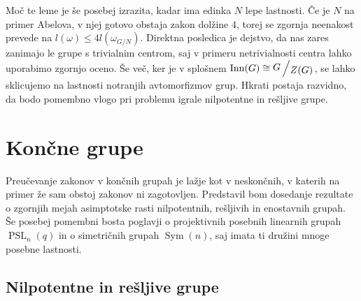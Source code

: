 \documentclass[12pt,a4paper]{article}
\newcounter{theoremcounter}[section] %
\newtheorem{definicija}[theoremcounter]{Definicija}
\newcommand{\quot}[2]{{\raisebox{0.1em}{$#1$}\left/\raisebox{-0.2em}{$#2$}\right.}}
\begin{document}
\noindent
Moč te leme je še posebej izrazita, kadar ima edinka $N$ lepe lastnosti. Če je $N$ na primer Abelova, v njej gotovo obstaja zakon dolžine $4$, torej se zgornja neenakost prevede na $l(\omega) \le 4 l(\omega_{G/N})$. Direktna posledica je dejstvo, da
nas zares zanimajo le grupe s trivialnim centrom, saj v primeru netrivialnosti centra lahko uporabimo zgornjo oceno. Še več, ker je v splošnem $\operatorname{Inn}(G) \cong \quot{G}{Z(G)}$, se lahko sklicujemo na lastnosti notranjih avtomorfizmov grup. Hkrati postaja razvidno, da bodo pomembno vlogo pri problemu igrale nilpotentne in rešljive grupe.

\section{Končne grupe}
Preučevanje zakonov v končnih grupah je lažje kot v neskončnih, v katerih na primer že sam obstoj zakonov ni zagotovljen. Predstavil bom dosedanje rezultate o zgornjih mejah asimptotske rasti nilpotentnih, rešljivih in enostavnih grupah. Še posebej pomembni bosta poglavji o
projektivnih posebnih linearnih grupah $\operatorname{PSL}_n(q)$ in o simetričnih grupah $\operatorname{Sym}(n)$, saj imata ti družini mnoge posebne lastnosti.

\subsection{Nilpotentne in rešljive grupe}


\end{document}
